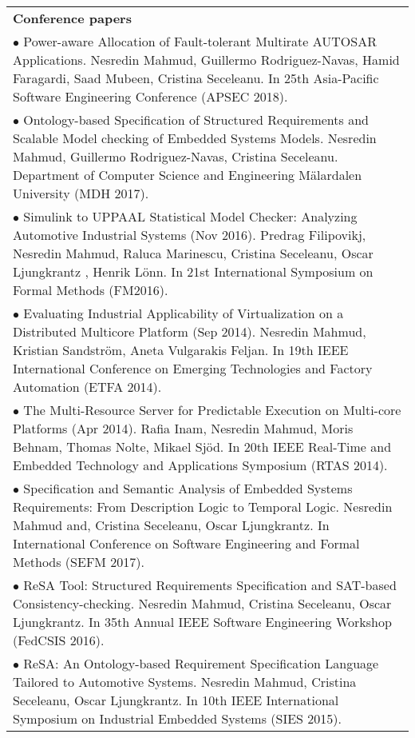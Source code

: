 \documentclass[11pt,a4paper,sans]{moderncv} %
\begin{document}
\begin{tabular}{@{}p{1\linewidth}@{}}
\textbf{Conference papers}\\[6pt]
$\bullet$ Power-aware Allocation of Fault-tolerant Multirate AUTOSAR Applications. Nesredin Mahmud, Guillermo Rodriguez-Navas, Hamid Faragardi, Saad Mubeen, Cristina Seceleanu. In 25th Asia-Pacific Software Engineering Conference (APSEC 2018).\\[6pt]

$\bullet$ Ontology-based Specification of Structured Requirements and Scalable Model checking of Embedded Systems Models. Nesredin Mahmud, Guillermo Rodriguez-Navas, Cristina Seceleanu. Department of Computer Science and Engineering Mälardalen University (MDH 2017).\\[6pt]

$\bullet$ Simulink to UPPAAL Statistical Model Checker: Analyzing Automotive Industrial Systems (Nov 2016). Predrag Filipovikj, Nesredin Mahmud, Raluca Marinescu, Cristina Seceleanu, Oscar Ljungkrantz , Henrik Lönn. In 21st International Symposium on Formal Methods (FM2016).\\[6pt]

$\bullet$ Evaluating Industrial Applicability of Virtualization on a Distributed Multicore Platform (Sep 2014). Nesredin Mahmud, Kristian Sandström, Aneta Vulgarakis Feljan. In 19th IEEE International Conference on Emerging Technologies and Factory Automation (ETFA 2014).\\[6pt]

$\bullet$ The Multi-Resource Server for Predictable Execution on Multi-core Platforms (Apr 2014). Rafia Inam, Nesredin Mahmud, Moris Behnam, Thomas Nolte, Mikael Sjöd. In 20th IEEE Real-Time and Embedded Technology and Applications Symposium (RTAS 2014).\\[6pt]

$\bullet$ Specification and Semantic Analysis of Embedded Systems Requirements: From Description Logic to Temporal Logic. Nesredin Mahmud and, Cristina Seceleanu, Oscar Ljungkrantz. In International Conference on Software Engineering and Formal Methods (SEFM 2017).\\[6pt]

$\bullet$ ReSA Tool: Structured Requirements Specification and SAT-based Consistency-checking. Nesredin Mahmud, Cristina Seceleanu, Oscar Ljungkrantz. In 35th Annual IEEE Software Engineering Workshop (FedCSIS 2016).\\[6pt]

$\bullet$ ReSA: An Ontology-based Requirement Specification Language Tailored to Automotive Systems. Nesredin Mahmud, Cristina Seceleanu, Oscar Ljungkrantz. In 10th IEEE International Symposium on Industrial Embedded Systems (SIES 2015).\\[6pt]

\end{tabular}
\end{document}
